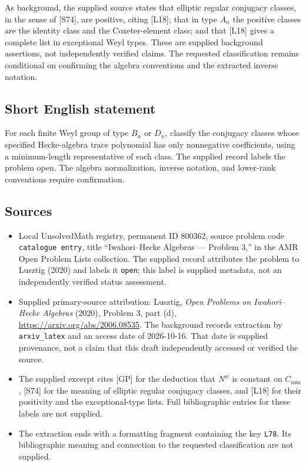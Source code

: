 \documentclass[11pt]{article}
\begin{document}
As background, the supplied source states that elliptic regular conjugacy classes, in the sense of [S74], are positive, citing [L18]; that in type \(A_n\) the positive classes are the identity class and the Coxeter-element class; and that [L18] gives a complete list in exceptional Weyl types. These are supplied background assertions, not independently verified claims. The requested classification remains conditional on confirming the algebra conventions and the extracted inverse notation.
\subsection{Short English statement}
For each finite Weyl group of type \(B_n\) or \(D_n\), classify the conjugacy classes whose specified Hecke-algebra trace polynomial has only nonnegative coefficients, using a minimum-length representative of each class. The supplied record labels the problem open. The algebra normalization, inverse notation, and lower-rank conventions require confirmation.
\subsection{Sources}
\begin{itemize}
\item Local UnsolvedMath registry, permanent ID \(800362\), source problem code \texttt{catalogue entry}, title ``Iwahori--Hecke Algebras --- Problem 3,'' in the AMR Open Problem Lists collection. The supplied record attributes the problem to Lusztig (2020) and labels it \texttt{open}; this label is supplied metadata, not an independently verified status assessment.
\item Supplied primary-source attribution: Lusztig, \emph{Open Problems on Iwahori--Hecke Algebras} (2020), Problem 3, part (d), \url{https://arxiv.org/abs/2006.08535}. The background records extraction by \texttt{arxiv\_latex} and an access date of 2026-10-16. That date is supplied provenance, not a claim that this draft independently accessed or verified the source.
\item The supplied excerpt cites [GP] for the deduction that \(N^w\) is constant on \(C_{\min}\), [S74] for the meaning of elliptic regular conjugacy classes, and [L18] for their positivity and the exceptional-type lists. Full bibliographic entries for these labels are not supplied.
\item The extraction ends with a formatting fragment containing the key \texttt{L78}. Its bibliographic meaning and connection to the requested classification are not supplied.
\end{itemize}
\end{document}
